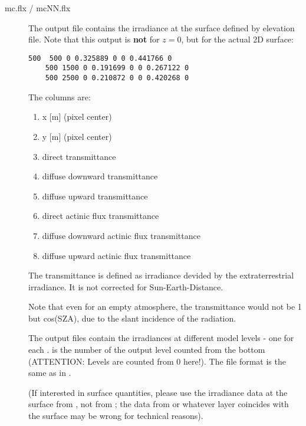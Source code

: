 \begin{description}
\item[mc.flx / mcNN.flx] 
  The output file  contains the irradiance
  at the surface defined by elevation file. Note that
  this output is {\bf not} for $z=0$, but for the actual 2D surface:
  \begin{Verbatim}[fontsize=\footnotesize, frame=single, samepage=true]
    500  500 0 0.325889 0 0 0.441766 0
    500 1500 0 0.191699 0 0 0.267122 0
    500 2500 0 0.210872 0 0 0.420268 0
  \end{Verbatim}
  The columns are:
  \begin{enumerate}
  \item  x [m] (pixel center)
  \item  y [m] (pixel center)
  \item  direct transmittance
  \item  diffuse downward transmittance
  \item  diffuse upward transmittance
  \item  direct actinic flux transmittance
  \item  diffuse downward actinic flux transmittance
  \item  diffuse upward actinic flux transmittance
  \end{enumerate}
  The transmittance is defined as irradiance devided by the extraterrestrial irradiance.
  It is not corrected for Sun-Earth-Distance.

  Note that even for an empty atmosphere, the transmittance
  would not be 1 but cos(SZA), due to the slant incidence of the radiation. 
  
  The output files  contain the irradiances
  at different model levels - one for each .  is the
  number of the output level counted from the bottom (ATTENTION: Levels are
  counted from 0 here!). The file format is the same as in .

  (If interested in surface quantities, please use the irradiance data at the
  surface from , not from ; the data from 
   or whatever layer coincides with the 
  surface may be wrong for technical reasons).


\end{description}

